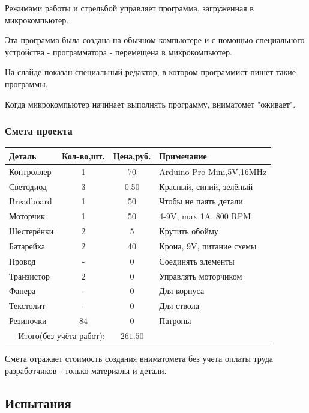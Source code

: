 Режимами работы и стрельбой управляет программа, загруженная в микрокомпьютер.

Эта программа была создана на обычном компьютере и с помощью специального устройства - программатора - перемещена в микрокомпьютер. 

На слайде показан специальный редактор, в котором программист пишет такие программы.

Когда микрокомпьютер начинает выполнять программу, вниматомет "оживает".

\begin{frame}
    \frametitle{Смета проекта \myDevice}
    
    \begin{center}
        \begin{tabular}{l|c|c|l}
            \hline\hline
            Деталь & Кол-во,шт. & Цена,руб. & Примечание \\
            \hline\hline
            Контроллер & 1  & 70   & Arduino Pro Mini,5V,16MHz\\
            Светодиод  & 3  & 0.50 & Красный, синий, зелёный\\
            Breadboard & 1  & 50   & Чтобы не паять детали\\
            Моторчик   & 1  & 50   & 4-9V, max 1A, 800 RPM\\
            Шестерёнки & 2  & 5    & Крутить обойму\\
            Батарейка  & 2  & 40   & Крона, 9V, питание схемы\\
            Провод     & -  & 0    & Соединять элементы\\
            Транзистор & 2  & 0    & Управлять моторчиком\\
            Фанера     & -  & 0    & Для корпуса\\
            Текстолит  & -  & 0    & Для ствола\\
            Резиночки  & 84 & 0    & Патроны\\ \hline
            \multicolumn{2}{r|}{Итого(\alert{без учёта работ}):} & \multicolumn{1}{c}{\alert{$261.50$}} & \\
        \end{tabular}
    \end{center}
\end{frame}

Смета отражает стоимость создания вниматомета без учета оплаты труда разработчиков - только материалы и детали.


\subsection{Испытания \myDevice}

